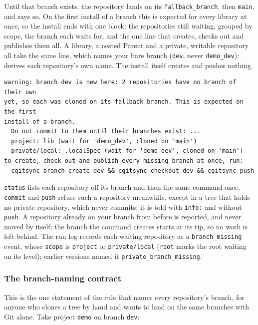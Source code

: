 Until that branch exists, the repository lands on its \texttt{fallback\_branch},
then \texttt{main}, and \cgscli{} says so. On the first install of a branch
this is expected for every library at once, so the install ends with one block:
the repositories still waiting, grouped by scope, the branch each waits for,
and the one line that creates, checks out and publishes them all. A library, a
nested Parent and a private, writable repository all take the same line, which
names your bare branch (\texttt{dev}, never \texttt{demo\_dev}):
\cgscli{} derives each repository's own name. The install itself creates and
pushes nothing.

\begin{verbatim}
warning: branch dev is new here: 2 repositories have no branch of their own
yet, so each was cloned on its fallback branch. This is expected on the first
install of a branch.
  Do not commit to them until their branches exist: ...
  project: lib (wait for 'demo_dev', cloned on 'main')
  private/local: .localSpec (wait for 'demo_dev', cloned on 'main')
to create, check out and publish every missing branch at once, run:
  cgitsync branch create dev && cgitsync checkout dev && cgitsync push
\end{verbatim}

\texttt{status} lists each repository off its branch and then the same command
once. \texttt{commit} and \texttt{push} refuse such a repository meanwhile,
except in a tree that holds no private repository, which never commits: it is
told with \texttt{info:} and without \texttt{push}. A repository already on
your branch from before is reported, and never moved by itself; the branch the
command creates starts at its tip, so no work is left behind. The run log
records each waiting repository as a \texttt{branch\_missing} event, whose
\texttt{scope} is \texttt{project} or \texttt{private/local} (\texttt{root}
marks the root waiting on its level); earlier versions named it
\texttt{private\_branch\_missing}.

\subsubsection{The branch-naming contract}
\label{sec:branch-naming-contract}

This is the one statement of the rule that names every repository's branch, for
anyone who clones a tree by hand and wants to land on the same branches
with Git alone. Take project \texttt{demo} on branch \texttt{dev}:

